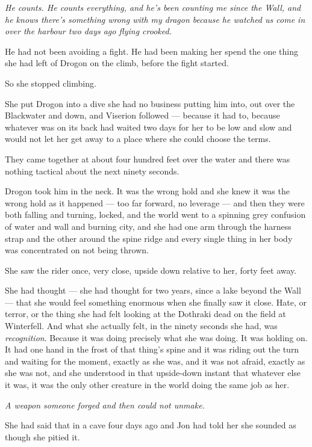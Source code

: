 \textit{He counts. He counts everything, and he’s been counting me since the Wall, and he knows there’s something wrong with my dragon because he watched us come in over the harbour two days ago flying crooked.}

He had not been avoiding a fight. He had been making her spend the one thing she had left of Drogon on the climb, before the fight started.

So she stopped climbing.

\sceneBreak

She put Drogon into a dive she had no business putting him into, out over the Blackwater and down, and Viserion followed — because it had to, because whatever was on its back had waited two days for her to be low and slow and would not let her get away to a place where she could choose the terms.

They came together at about four hundred feet over the water and there was nothing tactical about the next ninety seconds.

Drogon took him in the neck. It was the wrong hold and she knew it was the wrong hold as it happened — too far forward, no leverage — and then they were both falling and turning, locked, and the world went to a spinning grey confusion of water and wall and burning city, and she had one arm through the harness strap and the other around the spine ridge and every single thing in her body was concentrated on not being thrown.

She saw the rider once, very close, upside down relative to her, forty feet away.

She had thought — she had thought for two years, since a lake beyond the Wall — that she would feel something enormous when she finally saw it close. Hate, or terror, or the thing she had felt looking at the Dothraki dead on the field at Winterfell. And what she actually felt, in the ninety seconds she had, was \textit{recognition}. Because it was doing precisely what she was doing. It was holding on. It had one hand in the frost of that thing’s spine and it was riding out the turn and waiting for the moment, exactly as she was, and it was not afraid, exactly as she was not, and she understood in that upside-down instant that whatever else it was, it was the only other creature in the world doing the same job as her.

\textit{A weapon someone forged and then could not unmake.}

She had said that in a cave four days ago and Jon had told her she sounded as though she pitied it.

